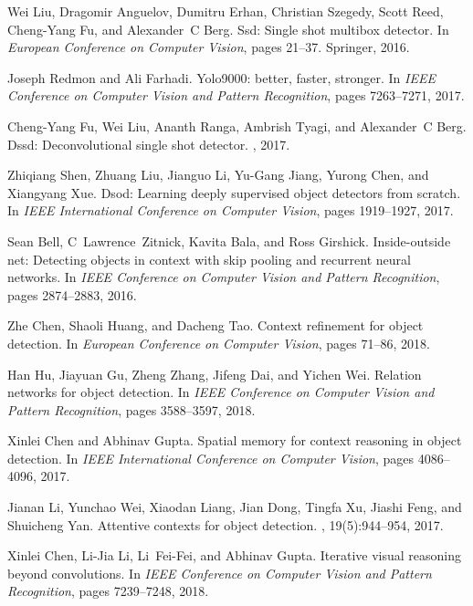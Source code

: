 \documentclass[journal]{IEEEtran}
\begin{document}
\begin{thebibliography}{10}
	Wei Liu, Dragomir Anguelov, Dumitru Erhan, Christian Szegedy, Scott Reed,
	Cheng-Yang Fu, and Alexander~C Berg.
	\newblock Ssd: Single shot multibox detector.
	\newblock In {\em European Conference on Computer Vision}, pages 21--37.
	Springer, 2016.
	
	Joseph Redmon and Ali Farhadi.
	\newblock Yolo9000: better, faster, stronger.
	\newblock In {\em IEEE Conference on Computer Vision and Pattern Recognition},
	pages 7263--7271, 2017.
	
	Cheng-Yang Fu, Wei Liu, Ananth Ranga, Ambrish Tyagi, and Alexander~C Berg.
	\newblock Dssd: Deconvolutional single shot detector.
	, 2017.
	
	Zhiqiang Shen, Zhuang Liu, Jianguo Li, Yu-Gang Jiang, Yurong Chen, and
	Xiangyang Xue.
	\newblock Dsod: Learning deeply supervised object detectors from scratch.
	\newblock In {\em IEEE International Conference on Computer Vision}, pages
	1919--1927, 2017.
	
	Sean Bell, C~Lawrence~Zitnick, Kavita Bala, and Ross Girshick.
	\newblock Inside-outside net: Detecting objects in context with skip pooling
	and recurrent neural networks.
	\newblock In {\em IEEE Conference on Computer Vision and Pattern Recognition},
	pages 2874--2883, 2016.
	
	Zhe Chen, Shaoli Huang, and Dacheng Tao.
	\newblock Context refinement for object detection.
	\newblock In {\em European Conference on Computer Vision}, pages 71--86, 2018.
	
	Han Hu, Jiayuan Gu, Zheng Zhang, Jifeng Dai, and Yichen Wei.
	\newblock Relation networks for object detection.
	\newblock In {\em IEEE Conference on Computer Vision and Pattern Recognition},
	pages 3588--3597, 2018.
	
	Xinlei Chen and Abhinav Gupta.
	\newblock Spatial memory for context reasoning in object detection.
	\newblock In {\em IEEE International Conference on Computer Vision}, pages
	4086--4096, 2017.
	
	Jianan Li, Yunchao Wei, Xiaodan Liang, Jian Dong, Tingfa Xu, Jiashi Feng, and
	Shuicheng Yan.
	\newblock Attentive contexts for object detection.
	, 19(5):944--954, 2017.
	
	Xinlei Chen, Li-Jia Li, Li~Fei-Fei, and Abhinav Gupta.
	\newblock Iterative visual reasoning beyond convolutions.
	\newblock In {\em IEEE Conference on Computer Vision and Pattern Recognition},
	pages 7239--7248, 2018.
	

\end{thebibliography}
\end{document}
